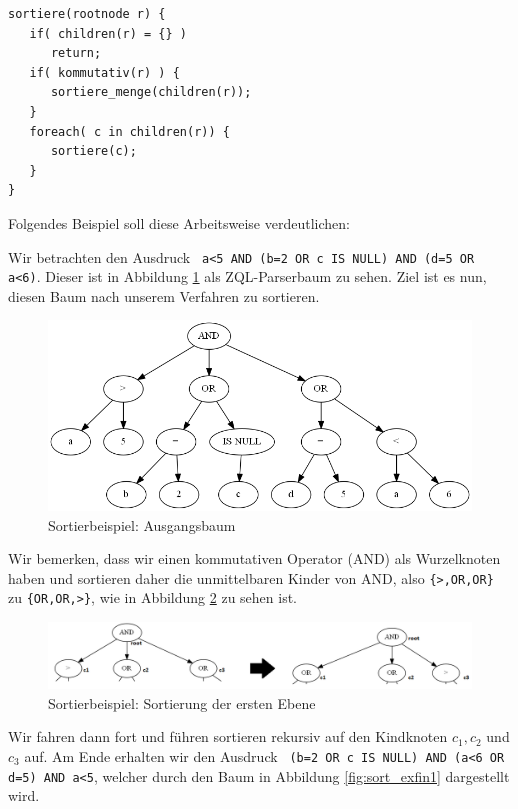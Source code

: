 \begin{verbatim}
sortiere(rootnode r) {
   if( children(r) = {} ) 
      return;
   if( kommutativ(r) ) {
      sortiere_menge(children(r));
   }
   foreach( c in children(r)) {
      sortiere(c);
   }
}
\end{verbatim}

Folgendes Beispiel soll diese Arbeitsweise verdeutlichen:

Wir betrachten den Ausdruck \verb| a<5 AND (b=2 OR c IS NULL) AND (d=5 OR a<6)|. Dieser ist in Abbildung \ref{fig:sort_ex0} als ZQL-Parserbaum zu sehen. Ziel ist es nun, diesen Baum nach unserem Verfahren zu sortieren.

\begin{figure}
\includegraphics[scale=0.6]{Bilder/sort_ex0.png}
\caption{Sortierbeispiel: Ausgangsbaum}
\label{fig:sort_ex0}
\end{figure}

Wir bemerken, dass wir einen kommutativen Operator (AND) als Wurzelknoten haben und sortieren daher die unmittelbaren Kinder von AND, also \verb|{>,OR,OR}| zu \verb|{OR,OR,>}|, wie in Abbildung \ref{fig:sort_ex1} zu sehen ist.

\begin{figure}
\includegraphics[scale=0.55]{Bilder/sort_ex12.png}
\caption{Sortierbeispiel: Sortierung der ersten Ebene}
\label{fig:sort_ex1}
\end{figure}

Wir fahren dann fort und führen sortieren rekursiv auf den Kindknoten $c_1,c_2$ und $c_3$ auf. Am Ende erhalten wir den Ausdruck \verb| (b=2 OR c IS NULL) AND (a<6 OR d=5) AND a<5|, welcher durch den Baum in Abbildung \ref{fig:sort_exfin1} dargestellt wird.

